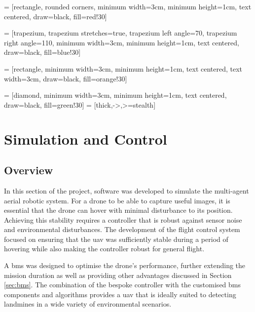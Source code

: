 \usetikzlibrary{shapes.geometric, arrows}

 = [rectangle, rounded corners, 
minimum width=3cm, 
minimum height=1cm,
text centered, 
draw=black, 
fill=red!30]

 = [trapezium, 
trapezium stretches=true, %
trapezium left angle=70, 
trapezium right angle=110, 
minimum width=3cm, 
minimum height=1cm, text centered, 
draw=black, fill=blue!30]

 = [rectangle, 
minimum width=3cm, 
minimum height=1cm, 
text centered, 
text width=3cm, 
draw=black, 
fill=orange!30]

 = [diamond, 
minimum width=3cm, 
minimum height=1cm, 
text centered, 
draw=black, 
fill=green!30]
 = [thick,->,>=stealth]



\section{Simulation and Control}

\subsection{Overview}

In this section of the project, software was developed to simulate the multi-agent aerial robotic system. For a drone to be able to capture useful images, it is essential that the drone can hover with minimal disturbance to its position. Achieving this stability requires a controller that is robust against sensor noise and environmental disturbances. The development of the flight control system focused on ensuring that the \gls{uav} was sufficiently stable during a period of hovering while also making the controller robust for general flight.

A \gls{bms} was designed to optimise the drone's performance, further extending the mission duration as well as providing other advantages discussed in Section \ref{sec:bms}. The combination of the bespoke controller with the customised \gls{bms} components and algorithms provides a \gls{uav} that is ideally suited to detecting landmines in a wide variety of environmental scenarios.

